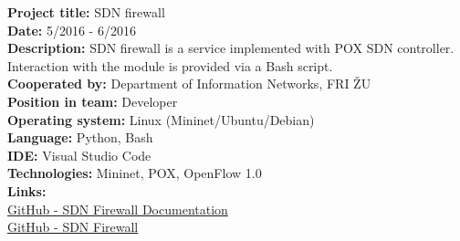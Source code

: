 \documentclass[slovak]{article}
\begin{document}
\noindent
\textbf{Project title:} SDN firewall\\
\textbf{Date:} 5/2016 - 6/2016\\
\textbf{Description:} SDN firewall is a service implemented with POX SDN controller. Interaction with the module is provided via a Bash script.\\
\textbf{Cooperated by:} Department of Information Networks, FRI ŽU\\
\textbf{Position in team:} Developer\\
\textbf{Operating system:} Linux (Mininet/Ubuntu/Debian)\\
\textbf{Language:} Python, Bash\\
\textbf{IDE:} Visual Studio Code\\
\textbf{Technologies:} Mininet, POX, OpenFlow 1.0\\
\textbf{Links:}\\
\href{https://github.com/kyberdrb/FRI/tree/master/Ing/4.semester/Integracia\_Sieti/semestralka}{GitHub - SDN Firewall Documentation}\\
\href{https://github.com/kyberdrb/sdnfirewall}{GitHub - SDN Firewall}
\end{document}
